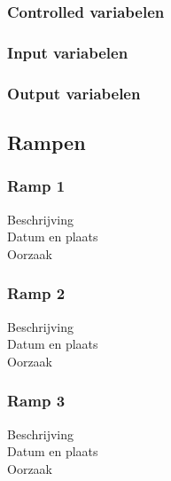 \documentclass{article}
\begin{document}
\subsubsection{Controlled variabelen}
\subsubsection{Input variabelen}
\subsubsection{Output variabelen}

\subsection{Rampen}

\subsubsection{Ramp 1}
\begin{description}
\item[Beschrijving]
\item[Datum en plaats] 
\item[Oorzaak]
\end{description}

\subsubsection{Ramp 2}
\begin{description}
\item[Beschrijving]
\item[Datum en plaats] 
\item[Oorzaak]
\end{description}

\subsubsection{Ramp 3}
\begin{description}
\item[Beschrijving]
\item[Datum en plaats] 
\item[Oorzaak]
\end{description}
\end{document}
